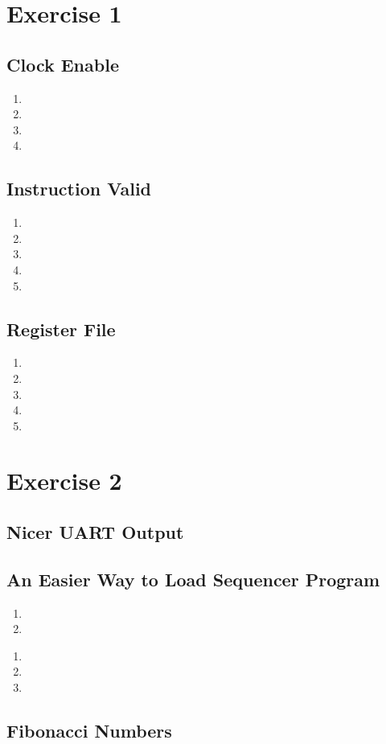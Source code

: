 \documentclass[]{article}
\begin{document}
\section{Exercise 1}


\subsection{Clock Enable}
\begin{enumerate}
\item 
\item 
\item 
\item 
\end{enumerate}
\subsection{Instruction Valid}
\begin{enumerate}
\item 
\item 
\item 
\item 
\item 
\end{enumerate}
\subsection{Register File}
\begin{enumerate}
\item 
\item 
\item 
\item 
\item 
\end{enumerate}

\section{Exercise 2}


\subsection{Nicer UART Output}
\subsection{An Easier Way to Load Sequencer Program}

\begin{enumerate}
\item 
\item
\end{enumerate}

\begin{enumerate}
\item 
\item
\item
\end{enumerate}

\subsection{Fibonacci Numbers}
\end{document}
